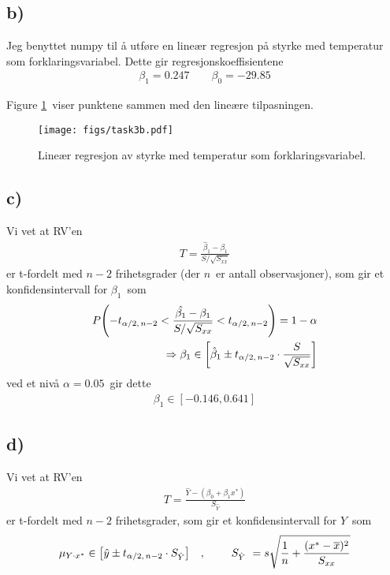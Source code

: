 \documentclass[12p,a4paper]{article}
\newcommand{\h}{\hat}
\renewcommand{\bar}{\overline}
\begin{document}
\subsection*{b)}
Jeg benyttet numpy til å utføre en lineær regresjon på styrke med temperatur som forklaringsvariabel. Dette gir regresjonskoeffisientene
\begin{align*}
    \beta_1 = 0.247 \quad\quad \beta_0 = -29.85
\end{align*}

Figure \ref{fig:4} viser punktene sammen med den lineære tilpasningen.


\begin{figure}[H]
    \centering
    \texttt{[image: figs/task3b.pdf]}
    \caption{Lineær regresjon av styrke med temperatur som forklaringsvariabel.}
    \label{fig:4}
\end{figure}


\subsection*{c)}
Vi vet at RV'en
\begin{align*}
    T = \frac{\h \beta_1 - \beta_1}{S/\sqrt{S_{xx}}}
\end{align*}
er t-fordelt med $n-2$ frihetsgrader (der $n$ er antall observasjoner), som gir et konfidensintervall for $\beta_1$ som
\begin{align*}
    P\qty(-t_{\alpha/2,\, n-2} < \frac{\hat{\beta_1} - \beta_1}{S/\sqrt{S_{xx}}} < t_{\alpha/2,\, n-2}) = 1-\alpha \\
    \Rightarrow \beta_1 \in \qty[\h \beta_1 \pm t_{\alpha/2,\, n-2}\cdot \frac{S}{\sqrt{S_{xx}}}]
\end{align*}
ved et nivå $\alpha = 0.05$ gir dette
\begin{align*}
    \beta_1 \in [-0.146, 0.641]
\end{align*}



\subsection*{d)}
Vi vet at RV'en
\begin{align*}
    T = \frac{\hat{Y} - (\beta_0 + \beta_1 x^*)}{S_{\hat{Y}}}
\end{align*}
er t-fordelt med $n-2$ frihetsgrader, som gir et konfidensintervall for $\hat{Y}$ som
\begin{align*}
    \mu_{Y\cdot x^*} \in \qty[\hat{y} \pm t_{\alpha/2,\, n-2}\cdot S_{\hat{Y}}]
    \quad, \quad\quad
    S_{\hat{Y}} = s\sqrt{\frac{1}{n} + \frac{(x^* - \bar{x})^2}{S_{xx}}}
\end{align*}
\end{document}
